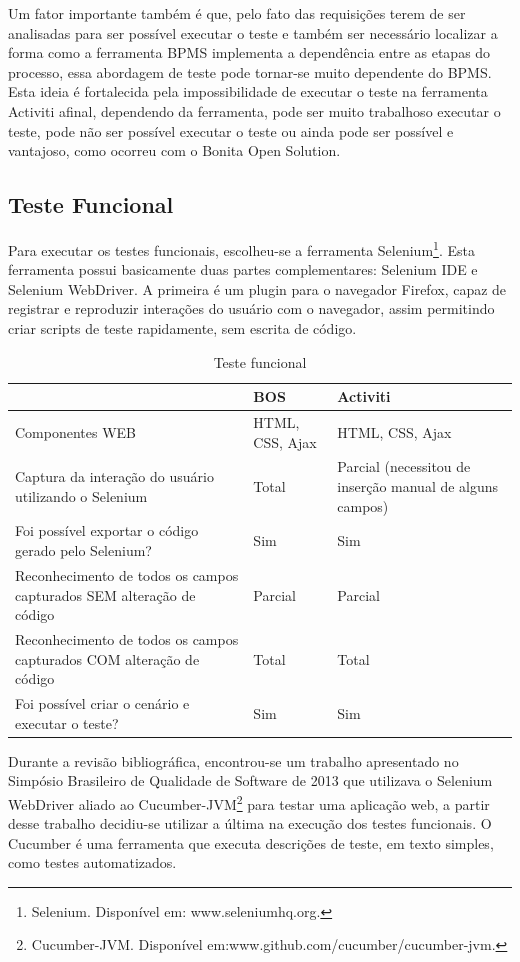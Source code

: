 \documentclass[12pt]{article}
\begin{document}
Um fator importante também é que, pelo fato das requisições terem de ser analisadas para ser possível executar o teste e também ser necessário localizar a forma como a ferramenta BPMS implementa a dependência entre as etapas do processo, essa abordagem de teste pode tornar-se muito dependente do BPMS. Esta ideia é fortalecida pela impossibilidade de executar o teste na ferramenta Activiti afinal, dependendo da ferramenta, pode ser muito trabalhoso executar o teste, pode não ser possível executar o teste ou ainda pode ser possível e vantajoso, como ocorreu com o Bonita Open Solution.

\subsection{Teste Funcional}
Para executar os testes funcionais, escolheu-se a ferramenta Selenium\footnote{Selenium. Disponível em: www.seleniumhq.org.}. Esta ferramenta possui basicamente duas partes complementares: Selenium IDE e Selenium WebDriver. A primeira é um plugin para o navegador Firefox, capaz de registrar e reproduzir interações do usuário com o navegador, assim permitindo criar scripts de teste rapidamente, sem escrita de código.


\begin{table}
{\scriptsize
\begin{tabular}{|p{5cm}|p{4cm}|p{4cm}|}
\hline
 & BOS & Activiti \\\hline
Componentes WEB & HTML, CSS, Ajax & HTML, CSS, Ajax \\\hline
Captura da interação do usuário utilizando o Selenium & Total & Parcial (necessitou de inserção manual de alguns campos) \\\hline
Foi possível exportar o código gerado pelo Selenium? & Sim & Sim \\\hline
Reconhecimento de todos os campos capturados SEM alteração de código & Parcial & Parcial \\\hline
Reconhecimento de todos os campos capturados COM alteração de código & Total & Total \\\hline
Foi possível criar o cenário e executar o teste? & Sim & Sim \\\hline
\end{tabular}
}
\caption{Teste funcional}
\label{tab:testeFuncional}
\end{table}

Durante a revisão bibliográfica, encontrou-se um trabalho apresentado no Simpósio Brasileiro de Qualidade de Software de 2013 \cite{sbqs2013} que utilizava o Selenium WebDriver aliado ao Cucumber-JVM\footnote{Cucumber-JVM. Disponível em:www.github.com/cucumber/cucumber-jvm.} para testar uma aplicação web, a partir desse trabalho decidiu-se utilizar a última na execução dos testes funcionais. O Cucumber é uma ferramenta que executa descrições de teste, em texto simples, como testes automatizados.
\end{document}
